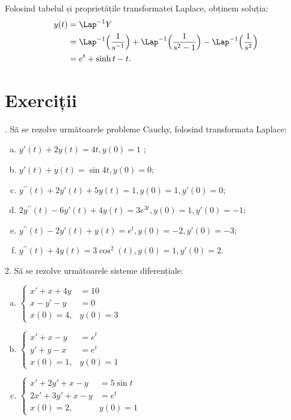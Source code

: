 Folosind tabelul și proprietățile transformatei Laplace, obținem soluția:
\begin{align*}
    y(t) &= \Lap^{-1} Y \\
         &= \Lap^{-1} \Big( \frac{1}{s^{-1}} \Big) + \Lap^{-1} \Big( \frac{1}{s^2 - 1} \Big) - %
         \Lap^{-1} \Big( \frac{1}{s^2} \Big) \\
         &= e^t + \sinh t - t.
\end{align*}

\vspace{0.3cm}


\section{Exerciții}

\indent{}. Să se rezolve următoarele probleme Cauchy, folosind transformata
Laplace:
\begin{enumerate}[(a)]
    \item $ y'(t) + 2y(t) = 4t, y(0) = 1 $ ;
    \item $ y'(t) + y(t) = \sin 4t, y(0) = 0 $;
    \item $ y^{\prime\prime}(t) + 2y'(t) + 5y(t) = 1, y(0) = 1, y'(0) = 0 $;
    \item $ 2y^{\prime\prime}(t) - 6y'(t) + 4y(t) = 3e^{3t}, y(0) = 1, y'(0) = -1 $;
    \item $ y^{\prime\prime}(t) - 2y'(t) + y(t) = e^t, y(0) = -2, y'(0) = -3 $;
    \item $ y^{\prime\prime}(t) + 4y(t) = 3\cos^2(t), y(0) = 1, y'(0) = 2 $.  
\end{enumerate}


\vspace{0.3cm}

2. Să se rezolve următoarele sisteme diferențiale:
\begin{enumerate}[(a)]
    \item $
        \begin{cases}
            x' + x + 4y &= 10 \\
            x - y' - y &= 0 \\
            x(0) = 4, & y(0) = 3
        \end{cases}
        $
    \item $
        \begin{cases}
            x' + x - y &= e^t \\
            y' + y - x &= e^t \\
            x(0) = 1, & y(0) = 1
        \end{cases}
        $
    \item $
        \begin{cases}
            x' + 2y' + x - y &= 5 \sin t \\
            2x' + 3y' + x - y &= e^t \\
            x(0) = 2, & y(0) = 1
        \end{cases}
        $
\end{enumerate}

